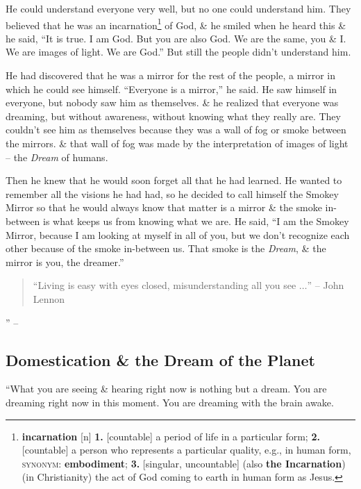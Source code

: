 \documentclass[oneside]{book}
\numberwithin{equation}{section}
\begin{document}
He could understand everyone very well, but no one could understand him. They believed that he was an incarnation\footnote{\textbf{incarnation} [n] \textbf{1.} [countable] a period of life in a particular form; \textbf{2.} [countable] a person who represents a particular quality, e.g., in human form, \textsc{synonym}: \textbf{embodiment}; \textbf{3.} [singular, uncountable] (also \textbf{the Incarnation}) (in Christianity) the act of God coming to earth in human form as Jesus.} of God, \& he smiled when he heard this \& he said, ``It is true. I am God. But you are also God. We are the same, you \& I. We are images of light. We are God.'' But still the people didn't understand him.

He had discovered that he was a mirror for the rest of the people, a mirror in which he could see himself. ``Everyone is a mirror,'' he said. He saw himself in everyone, but nobody saw him as themselves. \& he realized that everyone was dreaming, but without awareness, without knowing what they really are. They couldn't see him as themselves because they was a wall of fog or smoke between the mirrors. \& that wall of fog was made by the interpretation of images of light -- the \textit{Dream} of humans.

Then he knew that he would soon forget all that he had learned. He wanted to remember all the visions he had had, so he decided to call himself the Smokey Mirror so that he would always know that matter is a mirror \& the smoke in-between is what keeps us from knowing what we are. He said, ``I am the Smokey Mirror, because I am looking at myself in all of you, but we don't recognize each other because of the smoke in-between us. That smoke is the \textit{Dream}, \& the mirror is you, the dreamer.''
\begin{quotation}
	``Living is easy with eyes closed, misunderstanding all you see $\ldots$'' -- John Lennon
\end{quotation}
'' -- \cite[Introduction\texttt{/}The Smokey Mirror]{Ruiz2011}

\subsection{Domestication \& the Dream of the Planet}
``What you are seeing \& hearing right now is nothing but a dream. You are dreaming right now in this moment. You are dreaming with the brain awake.
\end{document}
